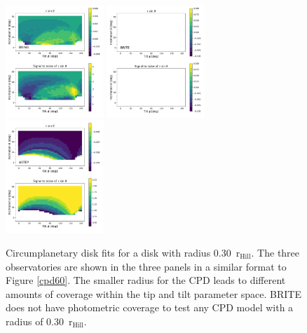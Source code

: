 \documentclass[longauth]{aa} %
\newcommand{\rhill}{$\mathrm{r_{Hill}}$} %
\begin{document}
\begin{figure}[htb]       
    \includegraphics[width=0.33\textwidth]{diskfit_BRING_030.pdf}   
    \includegraphics[width=0.33\textwidth]{diskfit_BRITE_030.pdf}
    \includegraphics[width=0.33\textwidth]{diskfit_ASTEP_030.pdf}
    \caption{Circumplanetary disk fits for a disk with radius 0.30\ \rhill. The three observatories are shown in the three panels in a similar format to Figure \ref{cpd60}. The smaller radius for the CPD leads to different amounts of coverage within the tip and tilt parameter space. BRITE does not have photometric coverage to test any CPD model with a radius of 0.30\ \rhill.}
    \label{cpd30}
\end{figure}
\end{document}
